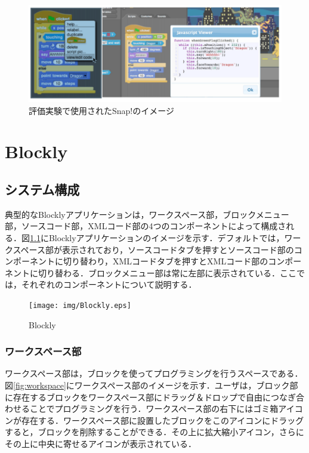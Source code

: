 \documentclass{risepaper}
\begin{document}
\begin{figure}[h]
\begin{center}
\includegraphics[scale=0.8]{img/idc.png}
\caption{評価実験で使用されたSnap!のイメージ}%
\label{fig:idc}
\end{center}%
\end{figure}%

   \chapter{Blockly}
  
  
   \section{システム構成}
   
典型的なBlocklyアプリケーションは，ワークスペース部，ブロックメニュー部，ソースコード部，XMLコード部の4つのコンポーネントによって構成される．図\ref{fig:Blockly}にBlocklyアプリケーションのイメージを示す．デフォルトでは，ワークスペース部が表示されており，ソースコードタブを押すとソースコード部のコンポーネントに切り替わり，XMLコードタブを押すとXMLコード部のコンポーネントに切り替わる．ブロックメニュー部は常に左部に表示されている．ここでは，それぞれのコンポーネントについて説明する．
  

\begin{figure}[h]
\begin{center}
\texttt{[image: img/Blockly.eps]}
\caption{Blockly}%
\label{fig:Blockly}
\end{center}%
\end{figure}%

   \subsection{ワークスペース部}

ワークスペース部は，ブロックを使ってプログラミングを行うスペースである．図\ref{fig:workspace}にワークスペース部のイメージを示す．ユーザは，ブロック部に存在するブロックをワークスペース部にドラッグ＆ドロップで自由につなぎ合わせることでプログラミングを行う．ワークスペース部の右下にはゴミ箱アイコンが存在する．ワークスペース部に設置したブロックをこのアイコンにドラッグすると，ブロックを削除することができる．その上に拡大縮小アイコン，さらにその上に中央に寄せるアイコンが表示されている．
\end{document}
